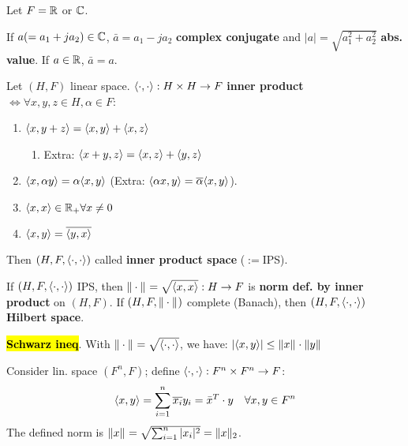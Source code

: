 Let $F=\mathbb R$ or $\mathbb C$.

\begin{Definition}
If $a(=a_1+ja_2)\in\mathbb C$, $\bar a=a_1-ja_2$ \textbf{complex conjugate} and $|a|=\sqrt{a_1^2+a_2^2}$ \textbf{abs. value}. If $a\in\mathbb R$, $\bar a=a$.
\end{Definition}
\begin{Definition}
Let $(H,F)$ linear space. $\langle\cdot,\cdot\rangle:H\times H\to F$ \textbf{inner product}$\Leftrightarrow\forall x,y,z\in H,\alpha\in F$:
\begin{enumerate}
  \item $\langle x,y+z\rangle=\langle x,y\rangle+\langle x,z\rangle$
  \begin{enumerate}
    \item Extra: $\langle x+y,z\rangle=\langle x,z\rangle+\langle y,z\rangle$
  \end{enumerate}
  \item $\langle x,\alpha y\rangle=\alpha\langle x,y\rangle$ (Extra: $\langle\alpha x,y\rangle=\overline\alpha\langle x,y\rangle$).
  \item $\langle x,x\rangle\in\mathbb R_+\forall x\ne 0$
  \item $\langle x,y\rangle=\overline{\langle y,x\rangle}$
\end{enumerate}
Then $(H,F,\langle\cdot,\cdot\rangle)$ called \textbf{inner product space} ($:=$IPS).
\end{Definition}
\begin{Theorem}
If $(H,F,\langle\cdot,\cdot\rangle)$ IPS, then $\|\cdot\|_{}=\sqrt{\langle x,x\rangle}:H\to F$ is \textbf{norm def. by inner product} on $(H,F)$. If $(H,F,\|\cdot\|_{})$ complete (Banach), then $(H,F,\langle\cdot,\cdot\rangle)$ \textbf{Hilbert space}.
\end{Theorem}
\begin{Theorem}
\textbf{\hl{Schwarz ineq}}. With $\|\cdot\|_{}=\sqrt{\langle\cdot,\cdot\rangle}$, we have: $|\langle x,y\rangle|\le\|x\|_{}\cdot\|y\|_{}$
\end{Theorem}
\begin{Definition}
Consider lin. space $(F^n,F)$; define $\langle\cdot,\cdot\rangle:F^n\times F^n\to F$:
\begin{equation*}
\langle x,y\rangle=\sum_{i=1}^n\overline{x_i}y_i=\bar x^T\cdot y\quad\forall x,y\in F^n
\end{equation*}
The defined norm is $\|x\|_{}=\sqrt{\sum_{i=1}^n|x_i|^2}=\|x\|_{2}$.
\end{Definition}
